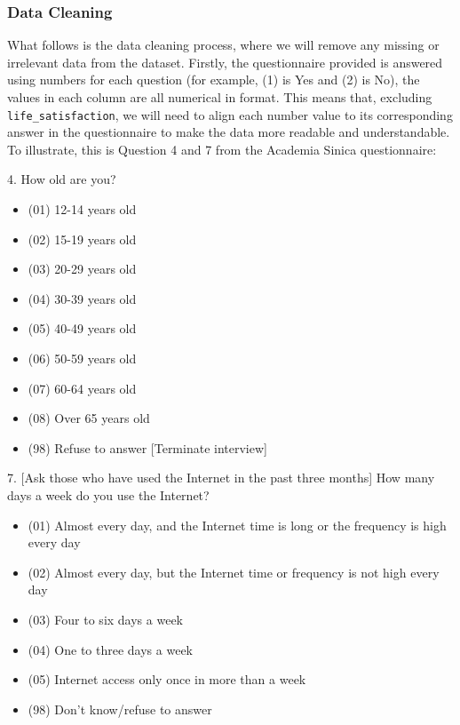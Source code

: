 \documentclass[12pt, a4paper]{article}
\begin{document}
\subsubsection{Data Cleaning}

\par What follows is the data cleaning process, where we will remove any missing or irrelevant data from the dataset.
Firstly, the questionnaire provided is answered using numbers for each question (for example, (1) is Yes and (2) is No), the values in each column are all numerical in format.
This means that, excluding \texttt{life\_satisfaction}, we will need to align each number value to its corresponding answer in the questionnaire to make the data more readable and understandable.
To illustrate, this is Question 4 and 7 from the Academia Sinica questionnaire:

\bigskip
\footnotesize

\par 4. How old are you?
\begin{itemize}
    \item (01)  12-14  years  old
    \item (02)  15-19  years  old
    \item (03)  20-29  years  old
    \item (04)  30-39  years  old
    \item (05)  40-49  years  old
    \item (06)  50-59  years  old
    \item (07)  60-64  years  old
    \item (08)  Over  65  years  old
    \item (98)  Refuse  to  answer  [Terminate interview]
\end{itemize}

\bigskip

\par \footnotesize 7. [Ask those who have used the Internet in the past three months] How many days a week do you use the Internet?
\begin{itemize}
    \item (01) Almost every day, and the Internet time is long or the frequency is high every day
    \item (02) Almost every day, but the Internet time or frequency is not high every day
    \item (03) Four to six days a week
    \item (04) One to three days a week
    \item (05) Internet access only once in more than a week
    \item (98) Don't know/refuse to answer
\end{itemize}
\end{document}
